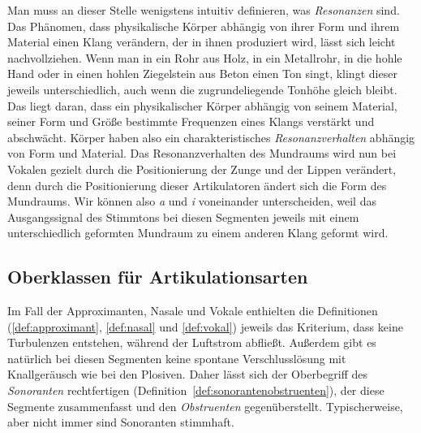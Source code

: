 
Man muss an dieser Stelle wenigstens intuitiv definieren, was \textit{Resonanzen} sind.
Das Phänomen, dass physikalische Körper abhängig von ihrer Form und ihrem Material einen Klang verändern, der in ihnen produziert wird, lässt sich leicht nachvollziehen.
Wenn man in ein Rohr aus Holz, in ein Metallrohr, in die hohle Hand oder in einen hohlen Ziegelstein aus Beton einen Ton singt, klingt dieser jeweils unterschiedlich, auch wenn die zugrundeliegende Tonhöhe gleich bleibt.
Das liegt daran, dass ein physikalischer Körper abhängig von seinem Material, seiner Form und Größe bestimmte Frequenzen eines Klangs verstärkt und abschwächt.
Körper haben also ein charakteristisches \textit{Resonanzverhalten} abhängig von Form und Material.
Das Resonanzverhalten des Mundraums wird nun bei Vokalen gezielt durch die Positionierung der Zunge und der Lippen verändert, denn durch die Positionierung dieser Artikulatoren ändert sich die Form des Mundraums.
Wir können also \textit{a} und \textit{i} voneinander unterscheiden, weil das Ausgangssignal des Stimmtons bei diesen Segmenten jeweils mit einem unterschiedlich geformten Mundraum zu einem anderen Klang geformt wird.

\subsection{Oberklassen für Artikulationsarten}

\label{sec:oberklassenfuerartikulationsarten}

Im Fall der Approximanten, Nasale und Vokale enthielten die Definitionen (\ref{def:approximant}, \ref{def:nasal} und \ref{def:vokal}) jeweils das Kriterium, dass keine Turbulenzen entstehen, während der Luftstrom abfließt.
Außerdem gibt es natürlich bei diesen Segmenten keine spontane Verschlusslösung mit Knallgeräusch wie bei den Plosiven.
Daher lässt sich der Oberbegriff des \textit{Sonoranten} rechtfertigen (Definition~\ref{def:sonorantenobstruenten}), der diese Segmente zusammenfasst und den \textit{Obstruenten} gegenüberstellt.
Typischerweise, aber nicht immer sind Sonoranten stimmhaft.



